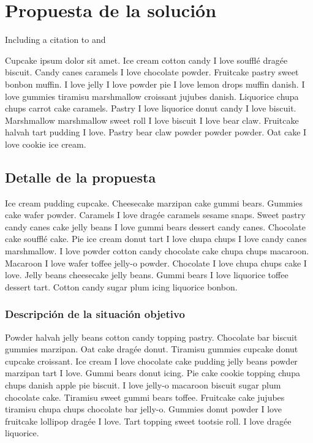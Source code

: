 \chapter{Propuesta de la solución}
\label{chapter:proposal}

Including a citation to \cite{latex} and \cite{Chakravarthy2009}

Cupcake ipsum dolor sit amet. Ice cream cotton candy I love soufflé dragée biscuit. Candy canes caramels I love chocolate powder. Fruitcake pastry sweet bonbon muffin. I love jelly I love powder pie I love lemon drops muffin danish. I love gummies tiramisu marshmallow croissant jujubes danish. Liquorice chupa chups carrot cake caramels. Pastry I love liquorice donut candy I love biscuit. Marshmallow marshmallow sweet roll I love biscuit I love bear claw. Fruitcake halvah tart pudding I love. Pastry bear claw powder powder powder. Oat cake I love cookie ice cream.

\section{Detalle de la propuesta}
\label{section:propuesta}

Ice cream pudding cupcake. Cheesecake marzipan cake gummi bears. Gummies cake wafer powder. Caramels I love dragée caramels sesame snaps. Sweet pastry candy canes cake jelly beans I love gummi bears dessert candy canes. Chocolate cake soufflé cake. Pie ice cream donut tart I love chupa chups I love candy canes marshmallow. I love powder cotton candy chocolate cake chupa chups macaroon. Macaroon I love wafer toffee jelly-o powder. Chocolate I love chupa chups cake I love. Jelly beans cheesecake jelly beans. Gummi bears I love liquorice toffee dessert tart. Cotton candy sugar plum icing liquorice bonbon.

\subsection{Descripción de la situación objetivo}
\label{subection:prop:situacion-objetivo}

Powder halvah jelly beans cotton candy topping pastry. Chocolate bar biscuit gummies marzipan. Oat cake dragée donut. Tiramisu gummies cupcake donut cupcake croissant. Ice cream I love chocolate cake pudding jelly beans powder marzipan tart I love. Gummi bears donut icing. Pie cake cookie topping chupa chups danish apple pie biscuit. I love jelly-o macaroon biscuit sugar plum chocolate cake. Tiramisu sweet gummi bears toffee. Fruitcake cake jujubes tiramisu chupa chups chocolate bar jelly-o. Gummies donut powder I love fruitcake lollipop dragée I love. Tart topping sweet tootsie roll. I love dragée liquorice.

